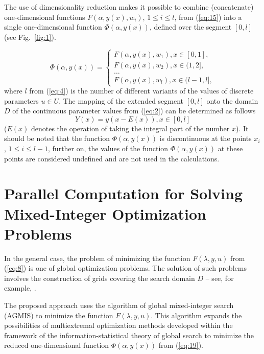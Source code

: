 \documentclass{svproc}
\begin{document}
The use of dimensionality reduction makes it possible to combine (concatenate) one-dimensional functions $F(\alpha, y(x),w_i)$, $1 \leq i \leq l$, from (\ref{eq:15}) into a single one-dimensional function $\Phi(\alpha,y(x))$, defined over the segment $[0,l]$ (see Fig.~\ref{fig:1}).

\begin{equation}\label{eq:19}
 \Phi(\alpha,y(x)) = 
\begin{cases}
F(\alpha,y(x),w_1 ),x \in [0,1], \\
F(\alpha,y(x),w_2 ),x \in (1,2], \\
\dots \\
F(\alpha,y(x),w_l ),x \in (l-1,l],
\end{cases}
\end{equation}
where $l$ from (\ref{eq:4}) is the number of different variants of the values of discrete parameters $u \in U$.  The mapping of the extended segment $[0,l]$ onto the domain $D$ of the continuous parameter values from (\ref{eq:2}) can be determined as follows 
\begin{equation}\label{eq:20}
Y(x)=y(x-E(x)),x\in[0,l]
\end{equation}
($E(x)$ denotes the operation of taking the integral part of the number $x$). It should be noted that the function $\Phi(\alpha,y(x))$ is discontinuous at the points $x_i$, $1 \leq i \leq l-1$,  further on, the values of the function $\Phi(\alpha,y(x))$ at these points are considered undefined and are not used in the calculations.
 




\section{Parallel Computation for Solving Mixed-Integer Optimization Problems}\label{sec:4}

In the general case, the problem of minimizing the function $F(\lambda,y,u)$ from (\ref{eq:8}) is one of  global optimization problems. The solution of such problems involves the construction of grids covering the search domain $D$ -- see, for example, \cite{c24,c25,c26,c27,c28,c29,c30,c31}.
 
The proposed approach uses the algorithm of global mixed-integer search (AGMIS) to minimize the function $F(\lambda,y,u)$. This algorithm expands the possibilities of multiextremal optimization methods developed within the framework of the information-statistical theory of global search \cite{c19,c20,c21,c22,c23,c32,c33,c34,c35,c36,c37,c38,c39} to minimize the reduced one-dimensional function $\Phi(\alpha,y(x))$ from (\ref{eq:19}).
 
\end{document}
